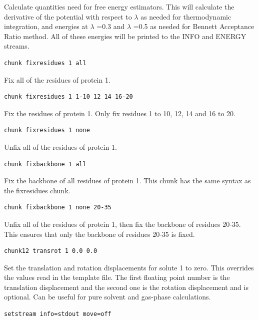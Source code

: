 \documentclass[letterpaper,10pt,english]{manual}
\begin{document}
Calculate quantities need for free energy estimators. This will calculate the derivative of the potential with respect to $\lambda$ as needed for thermodynamic integration, and energies at $\lambda$ =0.3 and $\lambda$ =0.5 as needed for Bennett Acceptance Ratio method. All of these energies will be printed to the INFO and ENERGY streams.
\begin{Verbatim}[commandchars=@\[\]]
chunk fixresidues 1 all
\end{Verbatim}

Fix all of the residues of protein 1.

\begin{Verbatim}[commandchars=@\[\]]
chunk fixresidues 1 1-10 12 14 16-20
\end{Verbatim}

Fix the residues of protein 1. Only fix residues 1 to 10, 12, 14 and 16 to 20.

\begin{Verbatim}[commandchars=@\[\]]
chunk fixresidues 1 none
\end{Verbatim}

Unfix all of the residues of protein 1.
\begin{Verbatim}[commandchars=@\[\]]
chunk fixbackbone 1 all
\end{Verbatim}

Fix the backbone of all residues of protein 1. This chunk has the same syntax as the fixresidues chunk.

\begin{Verbatim}[commandchars=@\[\]]
chunk fixbackbone 1 none 20-35
\end{Verbatim}

Unfix all of the residues of protein 1, then fix the backbone of residues 20-35. This ensures that only the backbone of residues 20-35 is fixed.

\begin{Verbatim}[commandchars=@\[\]]
chunk12 transrot 1 0.0 0.0
\end{Verbatim}

Set the translation and rotation displacements for solute 1 to zero. This overrides the values read in the template file. The first floating point number is the translation displacement and the second one is the rotation displacement and is optional. Can be useful for pure solvent and gas-phase calculations.
\begin{Verbatim}[commandchars=@\[\]]
setstream info=stdout move=off
\end{Verbatim}
\end{document}

